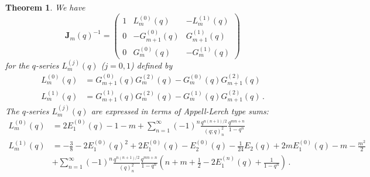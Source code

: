\documentclass[12pt,reqno]{amsart}
\newtheorem{theorem}{Theorem}
\theoremstyle{definition}
\def\be{\begin{equation}}
\def\ee{\end{equation}}
\def\bJ{\mathbf J}
\begin{document}
\begin{theorem}
\label{thm.41bJ2}  
We have
\be
\label{Jqinv}
\bJ_{m}(q)^{-1} =
\begin{pmatrix}
1 & L_{m}^{(0)}(q) & -L_{m}^{(1)}(q)     \\
0 & -G_{m+1}^{(0)}(q) & G_{m+1}^{(1)}(q) \\
0 & G_{m}^{(0)}(q) & -G_{m}^{(1)}(q)
\end{pmatrix} 
\ee
for the $q$-series $L_m^{(j)}(q)$ ($j=0,1$) defined by
\be
\label{L12}
\begin{aligned}
L^{(0)}_{m}(q) &=
G_{m+1}^{(0)}(q)G_{m}^{(2)}(q)-G_{m}^{(0)}(q)G_{m+1}^{(2)}(q)
\\
L_{m}^{(1)}(q) &=
G_{m+1}^{(1)}(q)G_{m}^{(2)}(q)-G_{m}^{(1)}(q)G^{(2)}_{m+1}(q) \,.
\end{aligned}
\ee
The $q$-series $L_m^{(j)}(q)$ are expressed in terms of Appell-Lerch type sums:
  \be
  \label{Lm}
  \begin{aligned}
L^{(0)}_{m}(q) &=
2E_{1}^{(0)}(q)-1-m+
\sum_{n=1}^{\infty}(-1)^{n}\frac{q^{n(n+1)/2}}{(q;q)_{n}^{2}}\frac{q^{mn+n}}{1-q^{n}}
\\
L_{m}^{(1)}(q) &=
-\frac{3}{8}-2E_{1}^{(0)}(q)^{2}+2E_{1}^{(0)}(q)-E_{2}^{(0)}(q)
-\frac{1}{24}E_{2}(q)+2mE_{1}^{(0)}(q)-m-\frac{m^{2}}{2}
\\
&+\sum_{n=1}^{\infty}(-1)^{n}\frac{q^{n(n+1)/2}}{(q)_{n}^{2}}
\frac{q^{mn+n}}{1-q^{n}}\left(n+m+\frac{1}{2}-2E^{(n)}_{1}(q)+\frac{1}{1-q^{n}}\right)
\,.
\end{aligned}
\ee
\end{theorem}
\end{document}
